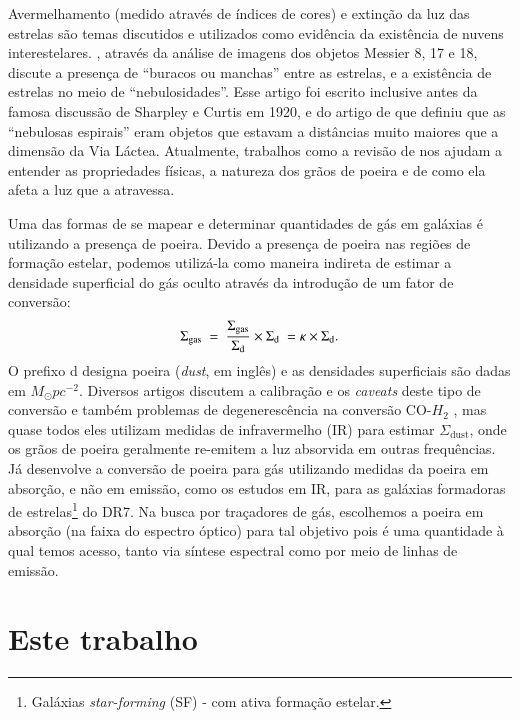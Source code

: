 Avermelhamento (medido através de índices de cores) e extinção da luz das estrelas são temas
discutidos e utilizados como evidência da existência de nuvens interestelares.
\citet{Barnard.1908a}, através da análise de imagens dos objetos Messier 8, 17 e 18, discute a
presença de ``buracos ou manchas'' entre as estrelas, e a existência de estrelas no meio de
``nebulosidades''. Esse artigo foi escrito inclusive antes da famosa discussão de Sharpley e Curtis
em 1920, e do artigo de \citet{Hubble.1925a} que definiu que as ``nebulosas espirais'' eram objetos
que estavam a distâncias muito maiores que a dimensão da Via Láctea. Atualmente, trabalhos como a
revisão de \citet{Draine.2003a} nos ajudam a entender as propriedades físicas, a natureza dos
grãos de poeira e de como ela afeta a luz que a atravessa.

Uma das formas de se mapear e determinar quantidades de gás em galáxias é utilizando a presença de
poeira. Devido a presença de poeira nas regiões de formação estelar, podemos utilizá-la como maneira
indireta de estimar a densidade superficial do gás oculto através da introdução de um fator de
conversão:
\begin{equation}
	\label{eq:dust2gas}
	\Sigma_{\mathrm{gas}}\ =\ \frac{\Sigma_{\mathrm{gas}}}{\Sigma_{\mathrm{d}}} \times \Sigma_{\mathrm{d}}\ = \kappa \times \Sigma_{\mathrm{d}}. 
\end{equation}
\noindent O prefixo d designa poeira ({\em dust}, em inglês) e as densidades superficiais são dadas
em $M_\odot pc^{-2}$. Diversos artigos discutem a calibração e os {\em caveats} deste tipo de
conversão e também problemas de degenerescência na conversão CO-$H_2$ \citep{Guiderdoni.Rocca.1987,
Leroy.etal.2011a, Leroy.etal.2013a, RemyRuyer.etal.2014a}, mas quase todos eles utilizam medidas de
infravermelho (IR) para estimar $\Sigma_{\mathrm{dust}}$, onde os grãos de poeira geralmente
re-emitem a luz absorvida em outras frequências. Já \citet[][BR13 daqui em
diante]{Brinchmann.etal.2013a} desenvolve a conversão de poeira para gás utilizando medidas da
poeira em absorção, e não em emissão, como os estudos em IR, para as galáxias formadoras de
estrelas\footnote{Galáxias {\em star-forming} (SF) - com ativa formação estelar.} do \SDSS DR7. Na
busca por traçadores de gás, escolhemos a poeira em absorção (na faixa do espectro óptico) para tal
objetivo pois é uma quantidade à qual temos acesso, tanto via síntese espectral como por meio de
linhas de emissão.

\section{Este trabalho}
\label{sec:intro:estetrabalho}

